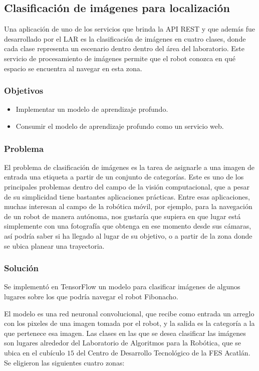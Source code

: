 \subsection{Clasificación de imágenes para localización}

Una aplicación de uno de los servicios que brinda la API REST
y que además fue desarrollado por el LAR es la clasificación de
imágenes en cuatro clases, donde cada clase representa
un escenario dentro dentro del área del laboratorio. Este servicio de procesamiento de imágenes permite que el robot conozca en qué espacio se encuentra al navegar en esta zona.

\subsubsection{Objetivos}

\begin{itemize}
    \item Implementar un modelo de aprendizaje profundo.
    \item Consumir el modelo de aprendizaje profundo como un servicio web.
\end{itemize}

\subsubsection{Problema}


El problema de clasificación de imágenes es la tarea de asignarle a una imagen de
entrada una etiqueta a partir de un conjunto de categorías. Este es uno de los principales
problemas dentro del campo de la visión computacional, que a pesar de su simplicidad
tiene bastantes aplicaciones prácticas. Entre esas aplicaciones, muchas interesan al
campo de la robótica móvil, por ejemplo, para la navegación de un robot de manera
autónoma, nos gustaría que supiera en que lugar está simplemente con una fotografía
que obtenga en ese momento desde sus cámaras, así podría saber si ha llegado al 
lugar de su objetivo, o a partir de la zona donde se ubica planear una trayectoria.

\subsubsection{Solución}


Se implementó en TensorFlow un modelo para clasificar imágenes
de algunos lugares sobre los que podría navegar el robot Fibonacho. 

El modelo es
una red neuronal convolucional, que recibe como entrada un arreglo con los
pixeles de una imagen tomada por el robot, y la salida es la categoría a la que pertenece esa imagen. 
Las clases en las que se desea clasificar las imágenes son lugares alrededor
del Laboratorio de Algoritmos para la Robótica, que se ubica en el cubículo $15$ del
Centro de Desarrollo Tecnológico de la FES Acatlán. Se eligieron las siguientes cuatro zonas:

